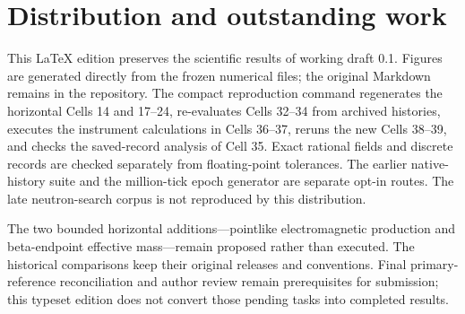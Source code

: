 \documentclass[11pt,a4paper]{article}
\begin{document}
\section{Distribution and outstanding work}\label{distribution-and-outstanding-work}

This LaTeX edition preserves the scientific results of working draft 0.1. Figures are generated directly from the frozen numerical files; the original Markdown remains in the repository. The compact reproduction command regenerates the horizontal Cells 14 and 17--24, re-evaluates Cells 32--34 from archived histories, executes the instrument calculations in Cells 36--37, reruns the new Cells 38--39, and checks the saved-record analysis of Cell 35. Exact rational fields and discrete records are checked separately from floating-point tolerances. The earlier native-history suite and the million-tick epoch generator are separate opt-in routes. The late neutron-search corpus is not reproduced by this distribution.

The two bounded horizontal additions---pointlike electromagnetic production and beta-endpoint effective mass---remain proposed rather than executed. The historical comparisons keep their original releases and conventions. Final primary-reference reconciliation and author review remain prerequisites for submission; this typeset edition does not convert those pending tasks into completed results.

\printbibliography[title={References and archived evidence}]
\end{document}
